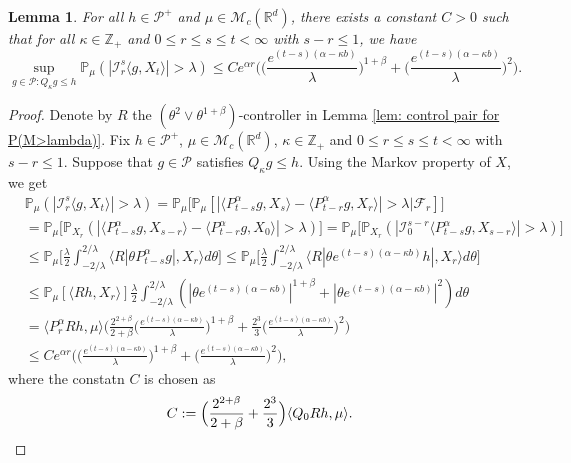 \documentclass[12pt,a4paper]{amsart}
\theoremstyle{plain}
\newtheorem{lem}[thm]{Lemma}
\theoremstyle{definition}
\numberwithin{equation}{section}
\begin{document}
\begin{lem}\label{lem: temp}
    For all $h \in \mathcal P^+$ and $\mu \in \mathcal M_c(\mathbb R^d)$, there exists a constant $C > 0$ such that for all $\kappa \in \mathbb Z_+ $ and $0\leq r\leq s\leq t<\infty$ with $s-r \leq 1$, we have
\[
    \sup_{g \in \mathcal P: Q_\kappa g\leq h}\mathbb P_{\mu}(|\mathcal I_r^s\langle g, X_t\rangle|>\lambda)
    \leq C e^{\alpha r} \bigg(\Big( \frac{e^{(t-s)(\alpha - \kappa b)}}{\lambda}\Big)^{1+\beta} + \Big( \frac{e^{(t-s)(\alpha - \kappa b)}}{\lambda}\Big)^{2} \bigg).
\]
\end{lem}
\begin{proof}
    Denote by $R$ the $(\theta^2\vee\theta^{1+\beta})$-controller in Lemma \ref{lem: control pair for P(M>lambda)}.
    Fix $h \in \mathcal P^+$, $\mu \in \mathcal M_c(\mathbb R^d)$, $\kappa \in \mathbb Z_+ $ and $0\leq r\leq s\leq t < \infty$ with $s-r \leq 1$.
    Suppose that $g\in \mathcal P$ satisfies $Q_\kappa g \leq h$.
    Using the Markov property of $X$, we get
\begin{equation}\begin{split}
    &\mathbb P_{\mu}(|\mathcal I_r^s\langle g, X_t\rangle|>\lambda)
    = \mathbb P_\mu \big[\mathbb P_\mu[|\langle P_{t-s}^\alpha g, X_{s}\rangle - \langle P_{t-r}^\alpha g, X_{r}\rangle|> \lambda\big| \mathscr F_r]\big]
    \\&= \mathbb P_\mu \big[\mathbb P_{X_r}(|\langle P_{t-s}^\alpha g, X_{s-r}\rangle - \langle P_{t-r}^\alpha g, X_{0}\rangle|> \lambda)\big]
    = \mathbb P_\mu \big[\mathbb P_{X_r}(|\mathcal I_0^{s-r}\langle P_{t-s}^\alpha g, X_{s-r}\rangle |> \lambda)\big]
    \\&\leq \mathbb P_\mu \Big[ \frac{\lambda}{2}\int_{-2/\lambda}^{2/\lambda}\langle R|\theta P^\alpha_{t-s}g|,X_r\rangle d\theta \Big]
    \leq \mathbb P_\mu \Big[ \frac{\lambda}{2}\int_{-2/\lambda}^{2/\lambda}\langle R|\theta e^{(t-s)(\alpha- \kappa b)}h|,X_r\rangle d\theta \Big]
    \\&\leq \mathbb P_\mu [ \langle Rh,X_r\rangle ] \frac{\lambda}{2}\int_{-2/\lambda}^{2/\lambda}(|\theta e^{(t-s)(\alpha- \kappa b)}|^{1+\beta} + |\theta e^{(t-s)(\alpha- \kappa b)}|^{2})d\theta
    \\& =  \langle P_r^\alpha Rh,\mu\rangle \bigg(  \frac{2^{2+\beta}}{2+\beta}\Big(\frac{e^{(t-s)(\alpha- \kappa b)}}{\lambda}\Big)^{1+\beta} + \frac{2^{3}}{3}\Big(\frac{e^{(t-s)(\alpha- \kappa b)}}{\lambda}\Big)^2\bigg)
    \\ & \leq C e^{\alpha r} \bigg(\Big( \frac{e^{(t-s)(\alpha - \kappa b)}}{\lambda}\Big)^{1+\beta} + \Big( \frac{e^{(t-s)(\alpha - \kappa b)}}{\lambda}\Big)^{2} \bigg),
\end{split}\end{equation}
    where the constatn $C$ is chosen as
\[
    C := \Big(\frac{2^{2+\beta}}{2+\beta} + \frac{2^{3}}{3} \Big)\langle Q_0Rh, \mu\rangle.
    \qedhere
\]
\end{proof}
\end{document}

